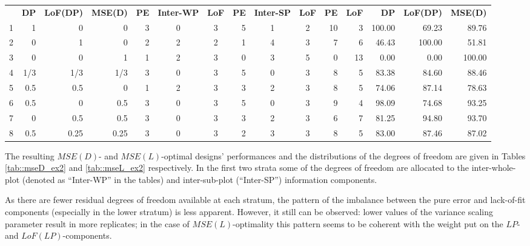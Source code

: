 \begin{table}[h]
{\begin{tabular}{rrrrccccccrrrrr}
  & \textbf{DP} & \textbf{LoF(DP)} & \textbf{MSE(D)} & \textbf{PE} & \textbf{Inter-WP} & \textbf{LoF} & \textbf{PE} & \textbf{Inter-SP} & \textbf{LoF}& \textbf{PE}      & \textbf{LoF}      & \textbf{DP} & \textbf{LoF(DP)} & \textbf{MSE(D)} \\
1 & 1    & 0    & 0    & \multicolumn{1}{|r}{3} & 0 & 3 & \multicolumn{1}{|r}{5} & 1 & 2 & \multicolumn{1}{|r}{10} & 3  & \multicolumn{1}{|r}{100.00} & 69.23  & 89.76  \\
2 & 0    & 1    & 0    & \multicolumn{1}{|r}{2} & 2 & 2 & \multicolumn{1}{|r}{1} & 4 & 3 & \multicolumn{1}{|r}{7}  & 6  & \multicolumn{1}{|r}{46.43}  & 100.00 & 51.81  \\
3 & 0    & 0    & 1    & \multicolumn{1}{|r}{1} & 2 & 3 & \multicolumn{1}{|r}{0} & 3 & 5 & \multicolumn{1}{|r}{0}  & 13 & \multicolumn{1}{|r}{0.00}   & 0.00   & 100.00 \\
4 &1/3  & 1/3  & 1/3   & \multicolumn{1}{|r}{3} & 0 & 3 & \multicolumn{1}{|r}{5} & 0 & 3 & \multicolumn{1}{|r}{8}  & 5  & \multicolumn{1}{|r}{83.38}  & 84.60  & 88.46  \\
5 & 0.5  & 0.5  & 0    & \multicolumn{1}{|r}{1} & 2 & 3 & \multicolumn{1}{|r}{3} & 2 & 3 & \multicolumn{1}{|r}{8}  & 5  & \multicolumn{1}{|r}{74.06}  & 87.14  & 78.63  \\
6 & 0.5  & 0    & 0.5  & \multicolumn{1}{|r}{3} & 0 & 3 & \multicolumn{1}{|r}{5} & 0 & 3 & \multicolumn{1}{|r}{9}  & 4  & \multicolumn{1}{|r}{98.09}  & 74.68  & 93.25  \\
7 & 0    & 0.5  & 0.5  & \multicolumn{1}{|r}{3} & 0 & 3 & \multicolumn{1}{|r}{3} & 2 & 3 & \multicolumn{1}{|r}{6}  & 7  & \multicolumn{1}{|r}{81.25}  & 94.80  & 93.70  \\
8 & 0.5  & 0.25 & 0.25 & \multicolumn{1}{|r}{3} & 0 & 3 & \multicolumn{1}{|r}{2} & 3 & 3 & \multicolumn{1}{|r}{8}  & 5  & \multicolumn{1}{|r}{83.00}  & 87.46  & 87.02  
\end{tabular}
}
\end{table}  

The resulting $MSE(D)$- and $MSE(L)$-optimal designs' performances and the distributions of the degrees of freedom are given in Tables \ref{tab::mseD_ex2} and \ref{tab::mseL_ex2} respectively. In the first two strata some of the degrees of freedom are allocated to the inter-whole-plot (denoted as ``Inter-WP'' in the tables) and inter-sub-plot (``Inter-SP'') information components. 

As there are fewer residual degrees of freedom available at each stratum, the pattern of the imbalance between the pure error and lack-of-fit components (especially in the lower stratum) is less apparent. However, it still can be observed: lower values of the variance scaling parameter result in more replicates; in the case of $MSE(L)$-optimality this pattern seems to be coherent with the weight put on the $LP$- and $LoF(LP)$-components. 

